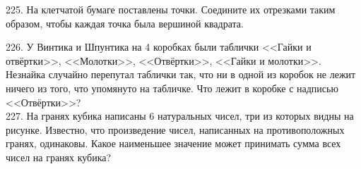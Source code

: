 \documentclass[12pt]{article}
\begin{document}
225. На клетчатой бумаге поставлены точки. Соедините их отрезками таким образом, чтобы каждая точка была вершиной квадрата.
\begin{center}
\begin{figure}[ht!]
\end{figure}
\end{center}
226. У Винтика и Шпунтика на 4 коробках были таблички <<Гайки и отвёртки>>, <<Молотки>>, <<Отвёртки>>, <<Гайки и молотки>>. Незнайка случайно перепутал таблички так, что ни в одной из коробок не лежит ничего из того, что упомянуто на табличке. Что лежит в коробке с надписью <<Отвёртки>>?\\
227. На гранях кубика написаны 6 натуральных чисел, три из которых видны на рисунке. Известно, что произведение чисел, написанных на противоположных гранях, одинаковы. Какое наименьшее значение может принимать сумма всех чисел на гранях кубика?
\begin{center}
\begin{figure}[ht!]
\end{figure}
\end{center}
\end{document}

